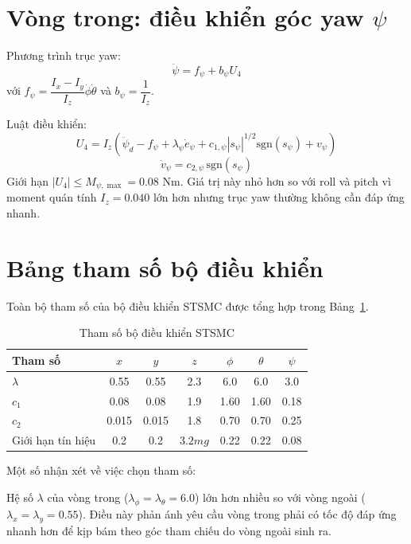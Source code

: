 \documentclass[12pt,a4paper]{report}
\begin{document}
\section{Vòng trong: điều khiển góc yaw $\psi$}
Phương trình trục yaw:
\begin{equation}
\ddot{\psi} = f_\psi + b_\psi U_4
\end{equation}
với $f_\psi = \dfrac{I_x - I_y}{I_z} \dot{\phi} \dot{\theta}$ và $b_\psi = \dfrac{1}{I_z}$.

Luật điều khiển:
\begin{equation}
U_4 = I_z \left( \ddot{\psi}_d - f_\psi + \lambda_\psi \dot{e}_\psi + c_{1,\psi} |s_\psi|^{1/2} \text{sgn}(s_\psi) + v_\psi \right)
\end{equation}
\begin{equation}
\dot{v}_\psi = c_{2,\psi} \, \text{sgn}(s_\psi)
\end{equation}
Giới hạn $|U_4| \le M_{\psi,\max} = 0.08$ Nm. Giá trị này nhỏ hơn so với roll và pitch vì moment quán tính $I_z = 0.040$ lớn hơn nhưng trục yaw thường không cần đáp ứng nhanh.

\section{Bảng tham số bộ điều khiển}
Toàn bộ tham số của bộ điều khiển STSMC được tổng hợp trong Bảng~\ref{tab:ctrl_params}.

\begin{table}[h!]
\centering
\caption{Tham số bộ điều khiển STSMC}
\label{tab:ctrl_params}
\renewcommand{\arraystretch}{1.3}
\begin{tabular}{|l|c|c|c|c|c|c|}
\hline
Tham số & $x$ & $y$ & $z$ & $\phi$ & $\theta$ & $\psi$ \\
\hline
$\lambda$ & 0.55 & 0.55 & 2.3 & 6.0 & 6.0 & 3.0 \\
$c_1$ & 0.08 & 0.08 & 1.9 & 1.60 & 1.60 & 0.18 \\
$c_2$ & 0.015 & 0.015 & 1.8 & 0.70 & 0.70 & 0.25 \\
Giới hạn tín hiệu & 0.2 & 0.2 & $3.2mg$ & 0.22 & 0.22 & 0.08 \\
\hline
\end{tabular}
\end{table}

Một số nhận xét về việc chọn tham số:

Hệ số $\lambda$ của vòng trong ($\lambda_\phi = \lambda_\theta = 6.0$) lớn hơn nhiều so với vòng ngoài ($\lambda_x = \lambda_y = 0.55$). Điều này phản ánh yêu cầu vòng trong phải có tốc độ đáp ứng nhanh hơn để kịp bám theo góc tham chiếu do vòng ngoài sinh ra.
\end{document}
